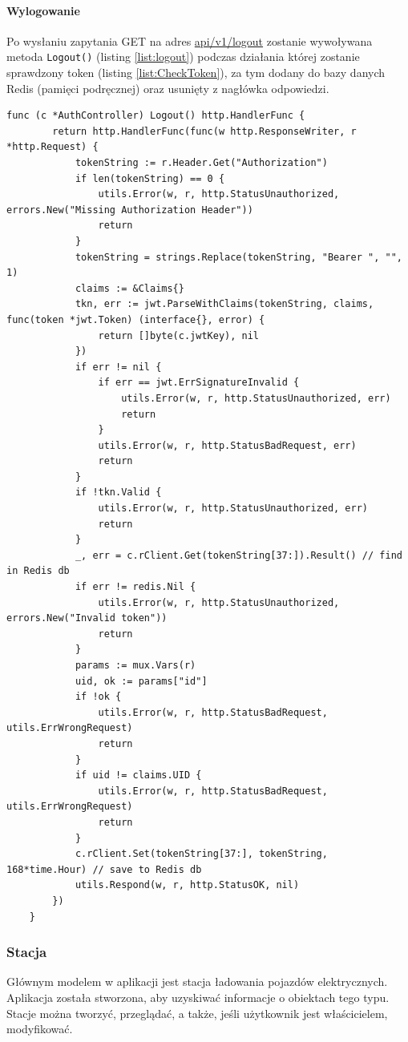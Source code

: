 \paragraph{Wylogowanie\newline}
Po wysłaniu zapytania GET na adres \url{api/v1/logout} zostanie wywoływana metoda \texttt{Logout()} (listing \ref{list:logout}) podczas działania której zostanie sprawdzony token (listing \ref{list:CheckToken}), za tym dodany do bazy danych Redis (pamięci podręcznej) oraz usunięty z nagłówka odpowiedzi.
\begin{lstlisting}[label=list:logout,caption=Wylogowanie,basicstyle=\tiny\ttfamily]
    func (c *AuthController) Logout() http.HandlerFunc {
        return http.HandlerFunc(func(w http.ResponseWriter, r *http.Request) {
            tokenString := r.Header.Get("Authorization")
            if len(tokenString) == 0 {
                utils.Error(w, r, http.StatusUnauthorized, errors.New("Missing Authorization Header"))
                return
            }
            tokenString = strings.Replace(tokenString, "Bearer ", "", 1)
            claims := &Claims{}
            tkn, err := jwt.ParseWithClaims(tokenString, claims, func(token *jwt.Token) (interface{}, error) {
                return []byte(c.jwtKey), nil
            })
            if err != nil {
                if err == jwt.ErrSignatureInvalid {
                    utils.Error(w, r, http.StatusUnauthorized, err)
                    return
                }
                utils.Error(w, r, http.StatusBadRequest, err)
                return
            }
            if !tkn.Valid {
                utils.Error(w, r, http.StatusUnauthorized, err)
                return
            }
            _, err = c.rClient.Get(tokenString[37:]).Result() // find in Redis db
            if err != redis.Nil {
                utils.Error(w, r, http.StatusUnauthorized, errors.New("Invalid token"))
                return
            }
            params := mux.Vars(r)
            uid, ok := params["id"]
            if !ok {
                utils.Error(w, r, http.StatusBadRequest, utils.ErrWrongRequest)
                return
            }
            if uid != claims.UID {
                utils.Error(w, r, http.StatusBadRequest, utils.ErrWrongRequest)
                return
            }
            c.rClient.Set(tokenString[37:], tokenString, 168*time.Hour) // save to Redis db
            utils.Respond(w, r, http.StatusOK, nil)
        })
    }
\end{lstlisting}

\subsubsection{Stacja}
Głównym modelem w aplikacji jest stacja ładowania pojazdów elektrycznych. Aplikacja została stworzona, aby uzyskiwać informacje o obiektach tego typu. Stacje można tworzyć, przeglądać, a także, jeśli użytkownik jest właścicielem, modyfikować.

